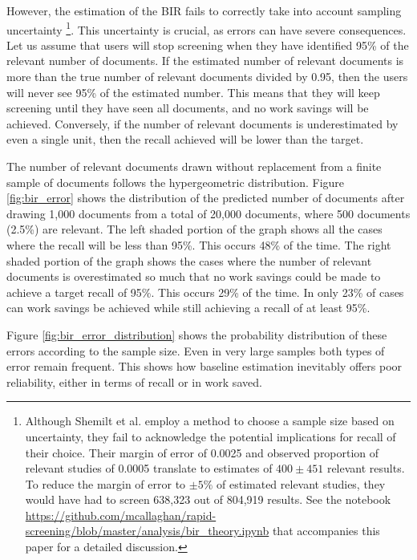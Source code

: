 \documentclass{bmcart}
\begin{document}
	
	However, the estimation of the BIR fails to correctly take into account sampling uncertainty \footnote{Although Shemilt et al. \cite{Shemilt2014} employ a method  to choose a sample size based on uncertainty, they fail to acknowledge the potential implications for recall of their choice. Their margin of error of 0.0025 and observed proportion of relevant studies of 0.0005 translate to estimates of $400 \pm 451$ relevant results. To reduce the margin of error to $\pm 5\%$ of estimated relevant studies, they would have had to screen 638,323 out of 804,919 results. See the notebook \url{https://github.com/mcallaghan/rapid-screening/blob/master/analysis/bir_theory.ipynb} that accompanies this paper for a detailed discussion.}. 
	This uncertainty is crucial, as errors can have severe consequences. Let us assume that users will stop screening when they have identified 95\% of the relevant number of documents. If the estimated number of relevant documents is more than the true number of relevant documents divided by 0.95, then the users will never see 95\% of the estimated number.  This means that they will keep screening until they have seen all documents, and no work savings will be achieved. Conversely, if the number of relevant documents is underestimated by even a single unit, then the recall achieved will be lower than the target.
	
	The number of relevant documents drawn without replacement from a finite sample of documents follows the hypergeometric distribution. 
	Figure \ref{fig:bir_error} shows the distribution of the predicted number of documents after drawing 1,000 documents from a total of 20,000 documents, where 500 documents (2.5\%) are relevant. The left shaded portion of the graph shows all the cases where the recall will be less than 95\%. This occurs 48\% of the time. The right shaded portion of the graph shows the cases where the number of relevant documents is overestimated so much that no work savings could be made to achieve a target recall of 95\%. This occurs 29\% of the time. In only 23\% of cases can work savings be achieved while still achieving a recall of at least 95\%. 
	
	Figure \ref{fig:bir_error_distribution} shows the probability distribution of these errors according to the sample size. Even in very large samples both types of error remain frequent.
	This shows how baseline estimation inevitably offers poor reliability, either in terms of recall or in work saved.
	
\end{document}
